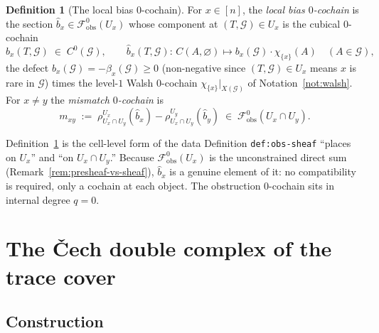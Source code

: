 \documentclass[11pt,oneside]{amsart}
\theoremstyle{plain}
\theoremstyle{definition}
\newtheorem{definition}[theorem]{Definition}
\theoremstyle{remark}
\theoremstyle{honeststyle}
\newcommand{\G}{\mathcal{G}}
\newcommand{\bias}{\beta}
\newcommand{\fobs}{\mathcal{F}_{\mathrm{obs}}}
\newcommand{\walsh}[1]{\chi_{#1}}
\begin{document}
\begin{definition}[The local bias $0$-cochain]
\label{def:bias}
For $x\in[n]$, the \emph{local bias $0$-cochain} is the section
$\widehat b_{x}\in\fobs^{0}(U_{x})$ whose component at $(T,\G)\in
U_{x}$ is the cubical $0$-cochain
\[
  \widehat b_{x}(T,\G)\;\in\;C^{0}(\G),\qquad
  \widehat b_{x}(T,\G)\colon\,C(A,\varnothing)\longmapsto
  b_{x}(\G)\cdot\walsh{\{x\}}(A)
  \quad(A\in\G),
\]
the defect $b_{x}(\G)=-\bias_{x}(\G)\ge0$ (non-negative since
$(T,\G)\in U_{x}$ means $x$ is rare in $\G$) times the level-$1$
Walsh $0$-cochain $\walsh{\{x\}}|_{X(\G)}$ of Notation~\ref{not:walsh}.
For $x\neq y$ the \emph{mismatch $0$-cochain} is
\[
  m_{xy}\;:=\;\rho^{U_{x}}_{U_{x}\cap U_{y}}(\widehat b_{x})
            -\rho^{U_{y}}_{U_{x}\cap U_{y}}(\widehat b_{y})
   \;\in\;\fobs^{0}(U_{x}\cap U_{y}).
\]
\end{definition}

Definition~\ref{def:bias} is the cell-level form of the data
Definition \texttt{def:obs-sheaf} ``places on $U_{x}$'' and ``on
$U_{x}\cap U_{y}$.'' Because $\fobs^{0}(U_{x})$ is the unconstrained
direct sum (Remark~\ref{rem:presheaf-vs-sheaf}), $\widehat b_{x}$ is a
genuine element of it: no compatibility is required, only a cochain at
each object. The obstruction $0$-cochain sits in internal degree
$q=0$.

\section{The \v{C}ech double complex of the trace cover}
\label{sec:bicomplex}

\subsection{Construction}
\label{ssec:bicomplexdef}
\end{document}
